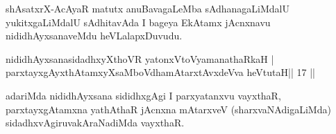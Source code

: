 \begin{artha}
shAsatxrX-AcAyaR matutx anuBavagaLeMba sAdhanagaLiMdalU yukitxgaLiMdalU sAdhitavAda I bageya EkAtamx jAcnxnavu nididhAyxsanaveMdu heVLalapxDuvudu.
\end{artha}

\begin{shl}
nididhAyxsanasidadhxyXthoVR yatonxV\s toV\s yamanathaRkaH |\\
parxtayxgAyxthAtamxyXsaMboVdhamAtarxtAvxdeVva heVtutaH\hfill || 17 ||
\end{shl}

\begin{artha}
adariMda nididhAyxsana sididhxgAgi I parxyatanxvu vayxthaR, parxtayxgAtamxna yathAthaR jAcnxna mAtarxveV (sharxvaNAdigaLiMda) sidadhxvAgiruvakAraNadiMda vayxthaR.
\end{artha}


